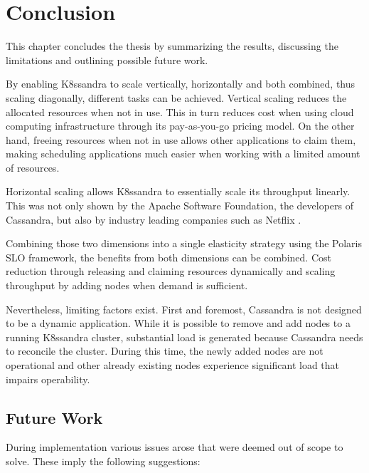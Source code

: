 \chapter{Conclusion}
\label{ch:conclusion}


This chapter concludes the thesis by summarizing the results, discussing the limitations and outlining possible future work.

By enabling K8ssandra to scale vertically, horizontally and both combined, thus scaling diagonally, different tasks can be achieved. Vertical scaling reduces the allocated resources when not in use. This in turn reduces cost when using cloud computing infrastructure through its pay-as-you-go pricing model. On the other hand, freeing resources when not in use allows other applications to claim them, making scheduling applications much easier when working with a limited amount of resources.

Horizontal scaling allows K8ssandra to essentially scale its throughput linearly. This was not only shown by the Apache Software Foundation, the developers of Cassandra, but also by industry leading companies such as Netflix \cite{cockroftBenchmarkingCassandraScalability2011}.

Combining those two dimensions into a single elasticity strategy using the Polaris SLO framework, the benefits from both dimensions can be combined. Cost reduction through releasing and claiming resources dynamically and scaling throughput by adding nodes when demand is sufficient.

Nevertheless, limiting factors exist. First and foremost, Cassandra is not designed to be a dynamic application. While it is possible to remove and add nodes to a running K8ssandra cluster, substantial load is generated because Cassandra needs to reconcile the cluster. During this time, the newly added nodes are not operational and other already existing nodes experience significant load that impairs operability.

\pagebreak

\section{Future Work}
\label{sec:future-work}

During implementation various issues arose that were deemed out of scope to solve. These imply the following suggestions:

